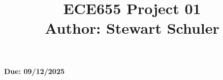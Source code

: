 \documentclass[a4paper,12pt]{article}
\begin{document}
 \title{ECE655 Project 01\\
                \vspace{4pt}
                \small{Author: Stewart Schuler}
                \vspace{-12pt}}
 \date{}
 \maketitle
 \begin{center}
 \textbf{Due: 09/12/2025}
 \end{center}

\tableofcontents

%
%

%

%
\end{document}
